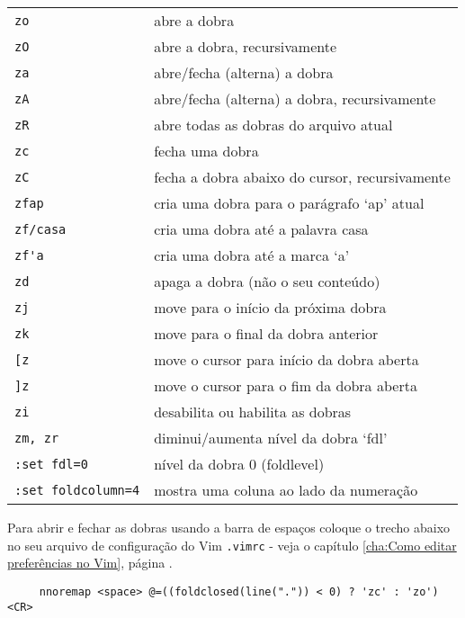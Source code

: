\begin{table}[htb]\begin{center} \begin{tabular}{ll} \hline
     \verb|zo| &  abre a dobra\\
     \verb|zO| &  abre a dobra, recursivamente\\
     \verb|za| &  abre/fecha (alterna) a dobra\\
     \verb|zA| & abre/fecha (alterna) a dobra, recursivamente\\
     \verb|zR| &  abre todas as dobras do arquivo atual\\
     \verb|zc| &  fecha uma dobra\\
     \verb|zC| &  fecha a dobra abaixo do cursor, recursivamente\\
     \verb|zfap| &  cria uma dobra para o parágrafo `ap' atual\\
     \verb|zf/casa| &  cria uma dobra até a palavra casa\\
     \verb|zf'a| &  cria uma dobra até a marca `a'\\
     \verb|zd| &  apaga a dobra (não o seu conteúdo)\\
     \verb|zj| &  move para o início da próxima dobra\\
     \verb|zk| &  move para o final da dobra anterior\\
     \verb|[z| &  move o cursor para início da dobra aberta\\
     \verb|]z| &  move o cursor para o fim da dobra aberta\\
     \verb|zi| &  desabilita ou habilita as dobras\\
     \verb|zm, zr| &  diminui/aumenta nível da dobra `fdl'\\
     \verb|:set fdl=0| &  nível da dobra 0 (foldlevel)\\
     \verb|:set foldcolumn=4| & mostra uma coluna ao lado da numeração\\
\hline \end{tabular}\end{center}\end{table}


Para abrir e fechar as dobras usando a barra de
espaços coloque o trecho abaixo no seu arquivo de configuração do Vim
\verb|.vimrc| - veja o capítulo \ref{cha:Como editar preferências no Vim}, página
\pageref{cha:Como editar preferências no Vim}.

\begin{verbatim}
     nnoremap <space> @=((foldclosed(line(".")) < 0) ? 'zc' : 'zo')<CR>
\end{verbatim}

